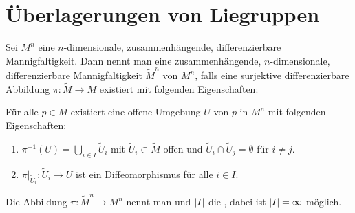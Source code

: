 \section{Überlagerungen von Liegruppen} %
\label{sec:13}

\begin{definition}[{name=[Überlagerung]}]
    Sei $M^n$ eine $n$-dimensionale, zusammenhängende, differenzierbare Mannigfaltigkeit.
    Dann nennt man eine zusammenhängende, $n$-dimensionale, differenzierbare Mannigfaltigkeit $\widetilde{M}^n$  von $M^n$, falls eine surjektive differenzierbare Abbildung $\pi \colon \widetilde{M} \to M$ existiert mit folgenden Eigenschaften:
    
    Für alle $p \in M$ existiert eine offene Umgebung $U$ von $p$ in $M^n$ mit folgenden Eigenschaften:
    \begin{enumerate}[1),itemsep=1pt]
        \item $\pi^{-1}(U) = \bigcup_{i \in I} \widetilde{U}_i$ mit $\widetilde{U}_i \subset \widetilde{M}$ offen und $\widetilde{U}_i \cap \widetilde{U}_j = \emptyset$ für $i \neq j$.
        \item $\pi\big|_{\widetilde{U}_i} \colon \widetilde{U}_i \to U$ ist ein Diffeomorphismus für alle $i \in I$.
    \end{enumerate}
    Die Abbildung $\pi \colon \widetilde{M}^n \to M^n$ nennt man  und $\abs*{I}$ die , dabei ist $\abs*{I}= \infty$ möglich.
\end{definition}



